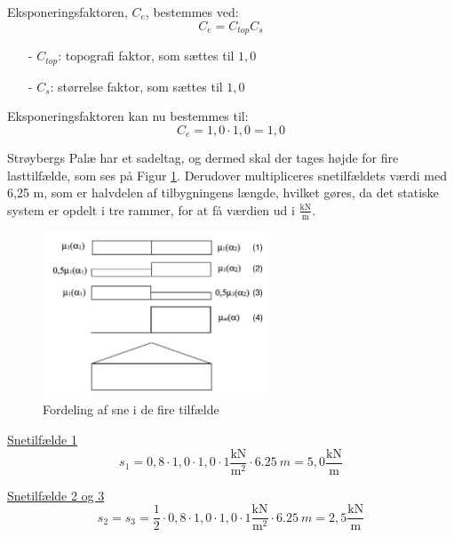Eksponeringsfaktoren, $C_e$, bestemmes ved:
\begin{equation}
	C_e=C_{top}C_s
\end{equation}
\begin{itemize}
	\item[-] $C_{top}$: topografi faktor, som sættes til $1,\!0$ \citep[ tabel 5.1 kapitel 5.2]{EU91}
	\item[-] $C_s$: størrelse faktor, som sættes til $1,\!0$ \citep[ kapitel 5.2]{EU91}
\end{itemize}

Eksponeringsfaktoren kan nu bestemmes til:
\begin{equation}
	C_e = 1,\!0 \cdot 1,\!0 = 1,\!0
\end{equation}

Strøybergs Palæ har et sadeltag, og dermed skal der tages højde for fire lasttilfælde, som ses på Figur \ref{fig:sne}. Derudover multipliceres snetilfældets værdi med 6,25 m, som er halvdelen af tilbygningens længde, hvilket gøres, da det statiske system er opdelt i tre rammer, for at få værdien ud i $\frac{\text{kN}}{\text{m}}$.

\begin{figure}[htbp]
	\centering
	\includegraphics[width=0.6\textwidth]{billeder/snelasttilfaelde.png}
	\caption{Fordeling af sne i de fire tilfælde \citep[ kapitel 5.3.3]{EU91}}
	\label{fig:sne}
\end{figure}

\underline{Snetilfælde 1}
\begin{equation}
	s_1 = 0,\!8\cdot 1,\!0\cdot 1,\!0\cdot 1 \frac{\text{kN}}{\text{m}^2}\cdot \SI{6,25}{m} = 5,\!0 \frac{\text{kN}}{\text{m}}
\end{equation}

\underline{Snetilfælde 2 og 3}
\begin{equation}
	s_2 = s_3 = \frac{1}{2}\cdot 0,\!8 \cdot 1,\!0 \cdot 1,\!0\cdot 1 \frac{\text{kN}}{\text{m}^2}\cdot \SI{6,25}{m} = 2,\!5 \frac{\text{kN}}{\text{m}}
\end{equation}

